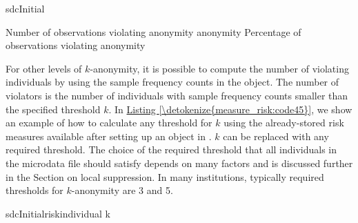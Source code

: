\documentclass[letterpaper,10pt,english]{sphinxmanual}
\begin{document}
\def\sphinxLiteralBlockLabel{\label{\detokenize{measure_risk:code44}}}
%
\begin{sphinxVerbatim}[commandchars=\\\{\},numbers=left,firstnumber=1,stepnumber=1]
 sdcInitial 

 Number of observations violating
   anonymity 
   anonymity 
 Percentage of observations violating
   anonymity  
\end{sphinxVerbatim}

For other levels of \(k\)-anonymity, it is possible to compute the
number of violating individuals by using the sample frequency counts in
the  object. The number of violators is the number of
individuals with sample frequency counts smaller than the specified
threshold \(k\). In \hyperref[\detokenize{measure_risk:code45}]{Listing \ref{\detokenize{measure_risk:code45}}}, we show an example of how to
calculate any threshold for \(k\) using the already-stored risk
measures available after setting up an  object in .
\(k\) can be replaced with any required threshold. The choice of the
required threshold that all individuals in the microdata file should
satisfy depends on many factors and is discussed further in the Section
on local suppression. In many institutions, typically required
thresholds for \(k\)-anonymity are 3 and 5.

\def\sphinxLiteralBlockLabel{\label{\detokenize{measure_risk:code45}}}
%
\begin{sphinxVerbatim}[commandchars=\\\{\},numbers=left,firstnumber=1,stepnumber=1]
 sdcInitialriskindividual\PYG{p}{[}\PYG{p}{]}  k
\end{sphinxVerbatim}
\end{document}
